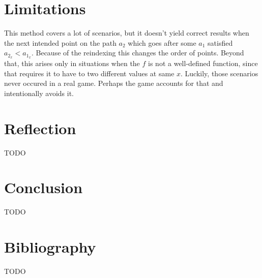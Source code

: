 \documentclass[12pt, titlepage]{article}
\newcommand{\TODO}{\begin{center}\color{red}TODO\end{center}}
\begin{document}
\section{Limitations}
This method covers a lot of scenarios, but it doesn't yield correct results
when the next intended point on the path $a_2$ which goes after some $a_1$
satisfied $a_{2_x} < a_{1_x}$. Because of the reindexing this changes the order
of points. Beyond that, this arises only in situations when the $f$ is not
a well-defined function, since that requires it to have to two different values
at same $x$. Luckily, those scenarios never occured in a real game. Perhaps 
the game accounts for that and intentionally avoids it.

\section{Reflection}
\TODO

\section{Conclusion}
\TODO

\section{Bibliography}
\appendix
\TODO
\end{document}
